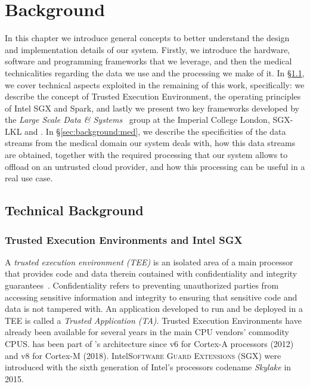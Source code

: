 \chapter{Background} \label{chap:background}

In this chapter we introduce general concepts to better understand the design and implementation details of our system.
Firstly, we introduce the hardware, software and programming frameworks that we leverage, and then the medical technicalities regarding the data we use and the processing we make of it.
In \S\ref{sec:background:tech}, we cover technical aspects exploited in the remaining of this work, specifically: we describe the concept of Trusted Execution Environment, the operating principles of Intel SGX and Spark, and lastly we present two key frameworks developed by the \textit{Large Scale Data \& Systems}~\cite{lsds} group at the Imperial College London, \textsc{SGX-LKL} and \sgxspark.
In \S\ref{sec:background:med}, we describe the specificities of the data streams from the medical domain our system deals with, how this data streams are obtained, together with the required processing that our system allows to offload on an untrusted cloud provider, and how this processing can be useful in a real use case.

\section{Technical Background} \label{sec:background:tech}

\subsection{Trusted Execution Environments and Intel SGX}
A \emph{trusted execution environment (TEE)} is an isolated area of a main processor that provides code and data therein contained with confidentiality and integrity guarantees~\cite{tee-globalplatform}. 
Confidentiality refers to preventing unauthorized parties from accessing sensitive information and integrity to ensuring that sensitive code and data is not tampered with.
An application developed to run and be deployed in a TEE is called a \emph{Trusted Application (TA)}.
Trusted Execution Environments have already been available for several years in the main CPU vendors' commodity CPUS.
\arm \tz has been part of \arm's architecture since v6 for Cortex-A processors (2012) and v8 for Cortex-M (2018).
Intel\textregistered\xspace \textsc{Software Guard Extensions (SGX)} were introduced with the sixth generation of Intel's processors codename \textit{Skylake} in 2015.


